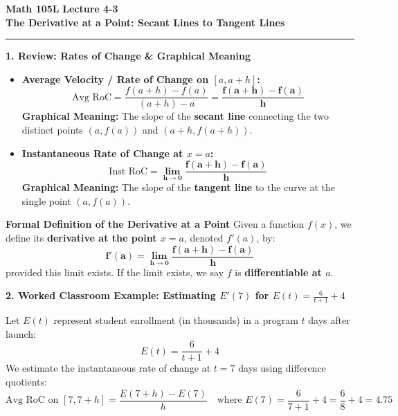 \documentclass[10.5pt]{article}
\begin{document}
\noindent \textbf{\large Math 105L} \hfill \textbf{\large Lecture 4-3}\\[1pt]
{\textbf{\Large The Derivative at a Point: Secant Lines to Tangent Lines}}\\[-5pt]
\rule{\textwidth}{1.2pt}

\vspace{0.03in}

\textbf{\large 1. Review: Rates of Change \& Graphical Meaning}

\begin{itemize}[leftmargin=1.2em, topsep=1pt, itemsep=3pt]
  \item \textbf{Average Velocity / Rate of Change on $[a, a+h]$:}
  \[
    \text{Avg RoC} = \frac{f(a+h) - f(a)}{(a+h) - a} = \mathbf{\frac{f(a+h) - f(a)}{h}}
  \]
  \textbf{Graphical Meaning:} The slope of the \textbf{secant line} connecting the two distinct points $(a, f(a))$ and $(a+h, f(a+h))$.
  
  \item \textbf{Instantaneous Rate of Change at $x = a$:}
  \[
    \text{Inst RoC} = \mathbf{\lim_{h\to 0}\frac{f(a+h) - f(a)}{h}}
  \]
  \textbf{Graphical Meaning:} The slope of the \textbf{tangent line} to the curve at the single point $(a, f(a))$.
\end{itemize}

\vspace{0.03in}

\begin{tcolorbox}[colback=boxbg, colframe=boxframe, boxrule=0.8pt, arc=3pt, left=8pt, right=8pt, top=4pt, bottom=4pt]
\textbf{\large Formal Definition of the Derivative at a Point}
Given a function $f(x)$, we define its \textbf{derivative at the point $x = a$}, denoted $f'(a)$, by:
\[
  \mathbf{f'(a) = \lim_{h\to 0}\frac{f(a+h) - f(a)}{h}}
\]
provided this limit exists. If the limit exists, we say $f$ is \textbf{differentiable at $a$}.
\end{tcolorbox}

\vspace{0.04in}

\textbf{\large 2. Worked Classroom Example: Estimating $E'(7)$ for $E(t) = \frac{6}{t+1} + 4$}

Let $E(t)$ represent student enrollment (in thousands) in a program $t$ days after launch:
\[
  E(t) = \frac{6}{t+1} + 4
\]
We estimate the instantaneous rate of change at $t = 7$ days using difference quotients:
\[
  \text{Avg RoC on } [7, 7+h] = \frac{E(7+h) - E(7)}{h} \quad \text{where } E(7) = \frac{6}{7+1} + 4 = \frac{6}{8} + 4 = 4.75
\]
\end{document}

